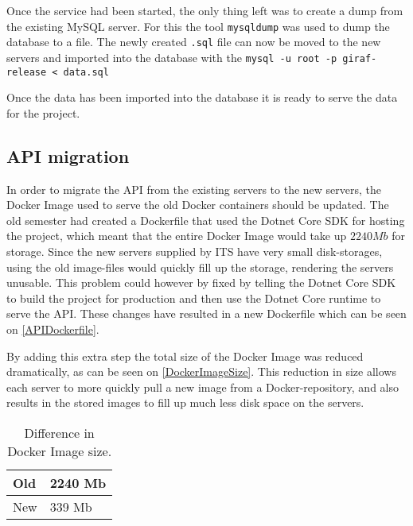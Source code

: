 Once the service had been started, the only thing left was to create a dump from the existing MySQL server.
For this the tool \lstinline$mysqldump$ was used to dump the database to a file.
The newly created \lstinline$.sql$ file can now be moved to the new servers and imported into the database with the \lstinline$mysql -u root -p giraf-release < data.sql$

Once the data has been imported into the database it is ready to serve the data for the project.

\subsection{API migration}
In order to migrate the API from the existing servers to the new servers, the Docker Image used to serve the old Docker containers should be updated.
The old semester had created a Dockerfile that used the Dotnet Core SDK for hosting the project, which meant that the entire Docker Image would take up $2240 Mb$ for storage.
Since the new servers supplied by ITS have very small disk-storages, using the old image-files would quickly fill up the storage, rendering the servers unusable.
This problem could however by fixed by telling the Dotnet Core SDK to build the project for production and then use the Dotnet Core runtime to serve the API.
These changes have resulted in a new Dockerfile which can be seen on \autoref{APIDockerfile}.

By adding this extra step the total size of the Docker Image was reduced dramatically, as can be seen on \autoref{DockerImageSize}.
This reduction in size allows each server to more quickly pull a new image from a Docker-repository, and also results in the stored images to fill up much less disk space on the servers.

\begin{table}[H]
\centering
\begin{tabular}{|l|l|}
\hline
Old & 2240 Mb \\ \hline
New &  339 Mb  \\ \hline
\end{tabular}
\caption{Difference in Docker Image size.}
\label{DockerImageSize}
\end{table}


